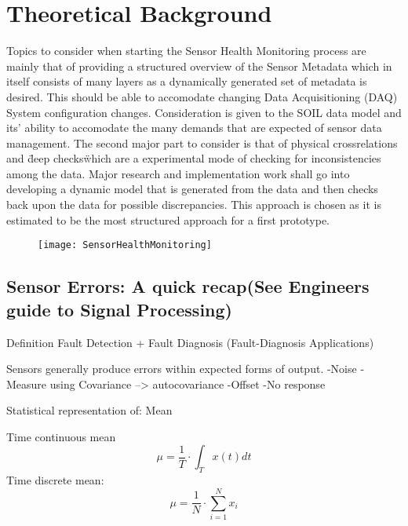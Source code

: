 \chapter{Theoretical Background}

Topics to consider when starting the Sensor Health Monitoring process are mainly that of providing a structured overview of the Sensor Metadata which in itself consists of many layers as a dynamically generated set of metadata is desired. This should be able to accomodate changing Data Acquisitioning (DAQ) System configuration changes.
Consideration is given to the SOIL data model and its' ability to accomodate the many demands that are expected of
sensor data management. \cite{Bodenbenner.2021}
The second major part to consider is that of physical crossrelations and \"deep checks\" which are a experimental mode of checking for inconsistencies among the data.
Major research and implementation work shall go into developing a dynamic model that is generated from the data and then checks back upon the data for possible discrepancies. This approach is chosen as it is estimated to be the most structured approach for a first prototype.



\begin{figure}[h]
         \centering
         \texttt{[image: SensorHealthMonitoring]}
         \caption{}
         \label{fig:}
\end{figure}



\section{Sensor Errors: A quick recap(See Engineers guide to Signal Processing)}
Definition Fault Detection + Fault Diagnosis (Fault-Diagnosis Applications)


Sensors generally produce errors within expected forms of output.
-Noise
    -Measure using Covariance --> autocovariance
-Offset
-No response

Statistical representation of:
Mean

\cite[S.13-17]{Smith.2006}

Time continuous mean
\begin{equation}
    \label{eq:mean_cont}
    \mu=\frac{1}{T} \cdot \int_T x(t) d t
\end{equation}
Time discrete mean:
\begin{equation}
    \label{eq:mean_disc}
\mu=\frac{1}{N} \cdot \sum_{i=1}^{N} x_i
\end{equation}





